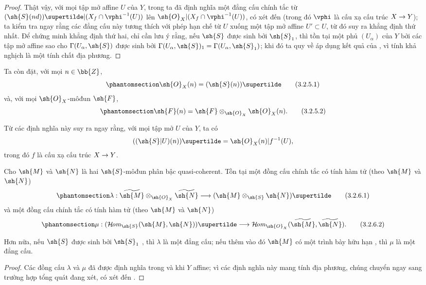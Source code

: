 \documentclass[oneside,10pt]{amsart}
\makeatletter
\newcommand{\ega@arrow}[2]{\mathchoice{#1}{#2}{#2}{#2}}
\renewcommand{\to}{\ega@arrow{\longrightarrow}{\rightarrow}}
\def\shHom{\mathcal{H}\!\mathit{om}}
\let\EGAOriginalLabel\label
\renewcommand{\label}[1]{\phantomsection\EGAOriginalLabel{#1}}
\makeatother
\begin{document}
\begin{proof}
Thật vậy, với mọi tập mở affine $U$ của $Y$, trong  ta đã định nghĩa một đẳng cấu chính tắc từ $(\sh{S}(nd))\supertilde|(X_f\cap\vphi^{-1}(U))$ lên $\sh{O}_X|(X_f\cap\vphi^{-1}(U))$, có xét đến  (trong đó $\vphi$ là cấu xạ cấu trúc $X\to Y$);
ta kiểm tra ngay rằng các đẳng cấu này tương thích với phép hạn chế từ $U$ xuống một tập mở affine $U'\subset U$, từ đó suy ra khẳng định thứ nhất.
Để chứng minh khẳng định thứ hai, chỉ cần lưu ý rằng, nếu $\sh{S}$ được sinh bởi $\sh{S}_1$, thì tồn tại một phủ $(U_\alpha)$ của $Y$ bởi các tập mở affine sao cho $\Gamma(U_\alpha,\sh{S})$ được sinh bởi $\Gamma(U_\alpha,\sh{S})_1=\Gamma(U_\alpha,\sh{S}_1)$;
khi đó ta quy về áp dụng kết quả của , vì tính khả nghịch là một tính chất địa phương.
\end{proof}

Ta còn đặt, với mọi $n\in\bb{Z}$,
\[
\label{II.3.2.5.1}
  \sh{O}_X(n)=(\sh{S}(n))\supertilde
\tag{3.2.5.1}
\]
và, với mọi $\sh{O}_X$-môđun $\sh{F}$,
\[
\label{II.3.2.5.2}
  \sh{F}(n)=\sh{F}\otimes_{\sh{O}_X}\sh{O}_X(n).
\tag{3.2.5.2}
\]

Từ các định nghĩa này suy ra ngay rằng, với mọi tập mở $U$ của $Y$, ta có
\[
  ((\sh{S}|U)(n))\supertilde=\sh{O}_X(n)|f^{-1}(U),
\]
trong đó $f$ là cấu xạ cấu trúc $X\to Y$.

\begin{proposition}[3.2.6]
\label{II.3.2.6}
Cho $\sh{M}$ và $\sh{N}$ là hai $\sh{S}$-môđun phân bậc quasi-coherent.
Tồn tại một đồng cấu chính tắc có tính hàm tử (theo $\sh{M}$ và $\sh{N}$)
\[
\label{II.3.2.6.1}
  \lambda:\widetilde{\sh{M}}\otimes_{\sh{O}_X}\widetilde{\sh{N}}\to(\sh{M}\otimes_{\sh{S}}\sh{N})\supertilde
\tag{3.2.6.1}
\]
và một đồng cấu chính tắc có tính hàm tử (theo $\sh{M}$ và $\sh{N}$)
\[
\label{II.3.2.6.2}
  \mu:(\shHom_{\sh{S}}(\sh{M},\sh{N}))\supertilde\to\shHom_{\sh{O}_X}(\widetilde{\sh{M}},\widetilde{\sh{N}}).
\tag{3.2.6.2}
\]

Hơn nữa, nếu $\sh{S}$ được sinh bởi $\sh{S}_1$ , thì $\lambda$ là một đẳng cấu;
nếu thêm vào đó $\sh{M}$ có một trình bày hữu hạn , thì $\mu$ là một đẳng cấu.
\end{proposition}

\begin{proof}
Các đồng cấu $\lambda$ và $\mu$ đã được định nghĩa trong  và  khi $Y$ affine;
vì các định nghĩa này mang tính địa phương, chúng chuyển ngay sang trường hợp tổng quát đang xét, có xét đến .
\end{proof}
\end{document}
